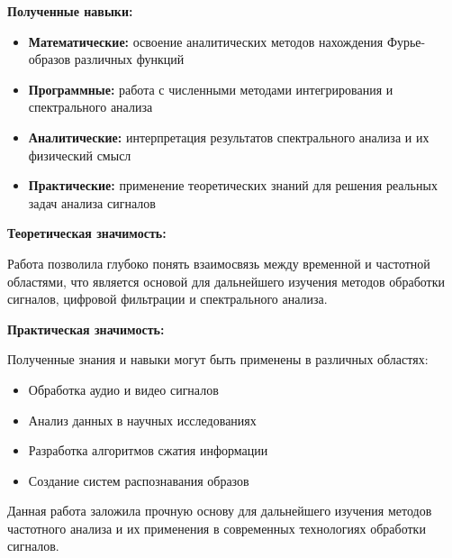 \textbf{Полученные навыки:}

\begin{itemize}
    \item \textbf{Математические:} освоение аналитических методов нахождения Фурье-образов различных функций
    \item \textbf{Программные:} работа с численными методами интегрирования и спектрального анализа
    \item \textbf{Аналитические:} интерпретация результатов спектрального анализа и их физический смысл
    \item \textbf{Практические:} применение теоретических знаний для решения реальных задач анализа сигналов
\end{itemize}

\textbf{Теоретическая значимость:}

Работа позволила глубоко понять взаимосвязь между временной и частотной областями, что является основой для дальнейшего изучения методов обработки сигналов, цифровой фильтрации и спектрального анализа.

\textbf{Практическая значимость:}

Полученные знания и навыки могут быть применены в различных областях:
\begin{itemize}
    \item Обработка аудио и видео сигналов
    \item Анализ данных в научных исследованиях
    \item Разработка алгоритмов сжатия информации
    \item Создание систем распознавания образов
\end{itemize}

Данная работа заложила прочную основу для дальнейшего изучения методов частотного анализа и их применения в современных технологиях обработки сигналов.


